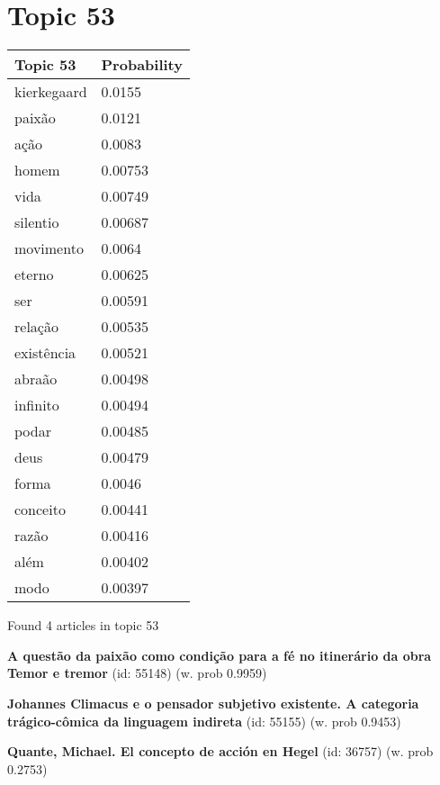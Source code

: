 \documentclass{article}
\begin{document}
\vfill
\newpage


\centering
\thispagestyle{empty}
\section*{Topic 53}\vfill
\begin{tabular}{ll}
\toprule
    Topic 53 & Probability \\
\midrule
 kierkegaard &      0.0155 \\
      paixão &      0.0121 \\
        ação &      0.0083 \\
       homem &     0.00753 \\
        vida &     0.00749 \\
    silentio &     0.00687 \\
   movimento &      0.0064 \\
      eterno &     0.00625 \\
         ser &     0.00591 \\
     relação &     0.00535 \\
  existência &     0.00521 \\
      abraão &     0.00498 \\
    infinito &     0.00494 \\
       podar &     0.00485 \\
        deus &     0.00479 \\
       forma &      0.0046 \\
    conceito &     0.00441 \\
       razão &     0.00416 \\
        além &     0.00402 \\
        modo &     0.00397 \\
\bottomrule
\end{tabular}

\vfill
Found 4 articles in topic 53
\vfill

\textbf{A questão da paixão como condição para a fé no itinerário da obra Temor e tremor} (id: 55148)
 (w. prob 0.9959)
\vfill

\textbf{Johannes Climacus e o pensador subjetivo existente. A categoria trágico-cômica da linguagem indireta} (id: 55155)
 (w. prob 0.9453)
\vfill

\textbf{Quante, Michael. El concepto de acción en Hegel} (id: 36757)
 (w. prob 0.2753)

\vfill
\newpage


\centering
\thispagestyle{empty}
\end{document}
